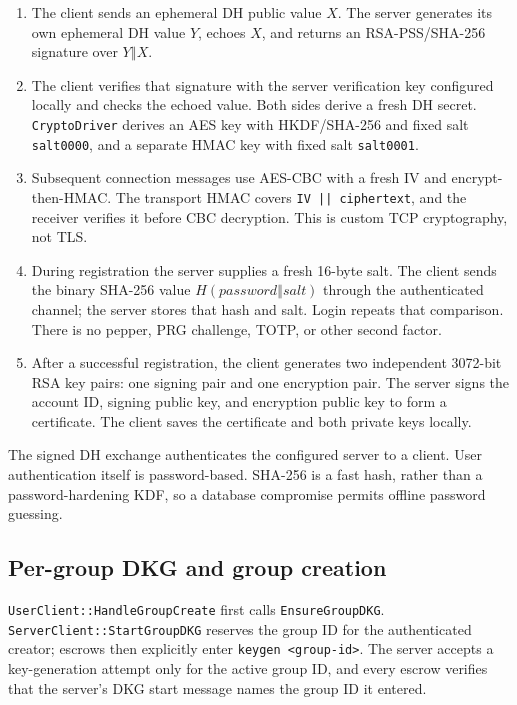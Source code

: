 \documentclass[11pt,a4paper]{article}
\begin{document}
\begin{enumerate}
	\item The client sends an ephemeral DH public value $X$. The server generates its own ephemeral DH value $Y$, echoes $X$, and returns an RSA-PSS/SHA-256 signature over $Y\mathbin\Vert X$.
	\item The client verifies that signature with the server verification key configured locally and checks the echoed value. Both sides derive a fresh DH secret. \texttt{CryptoDriver} derives an AES key with HKDF/SHA-256 and fixed salt \texttt{salt0000}, and a separate HMAC key with fixed salt \texttt{salt0001}.
	\item Subsequent connection messages use AES-CBC with a fresh IV and encrypt-then-HMAC. The transport HMAC covers \texttt{IV || ciphertext}, and the receiver verifies it before CBC decryption. This is custom TCP cryptography, not TLS.
	\item During registration the server supplies a fresh 16-byte salt. The client sends the binary SHA-256 value $H(\textit{password}\mathbin\Vert\textit{salt})$ through the authenticated channel; the server stores that hash and salt. Login repeats that comparison. There is no pepper, PRG challenge, TOTP, or other second factor.
	\item After a successful registration, the client generates two independent 3072-bit RSA key pairs: one signing pair and one encryption pair. The server signs the account ID, signing public key, and encryption public key to form a certificate. The client saves the certificate and both private keys locally.
\end{enumerate}

The signed DH exchange authenticates the configured server to a client. User authentication itself is password-based. SHA-256 is a fast hash, rather than a password-hardening KDF, so a database compromise permits offline password guessing.

\subsection{Per-group DKG and group creation}

\texttt{UserClient::HandleGroupCreate} first calls \texttt{EnsureGroupDKG}. \texttt{ServerClient::StartGroupDKG} reserves the group ID for the authenticated creator; escrows then explicitly enter \texttt{keygen <group-id>}. The server accepts a key-generation attempt only for the active group ID, and every escrow verifies that the server's DKG start message names the group ID it entered.
\end{document}
